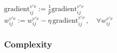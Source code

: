 \begin{frame}
{{{            }
			$\text{gradient}_{ij}^{v'v} := \frac{1}{p} \text{gradient}_{ij}^{v'v}$\\
			 $w_{ij}^{v'v} := w_{ij}^{v'v} - \eta
					\, \text{gradient}_{ij}^{v'v} 
					\,, \quad \forall w_{ij}^{v'v}	$
					\vspace{-1.5mm}
		}
}
\end{frame}

\subsubsection{Complexity}

